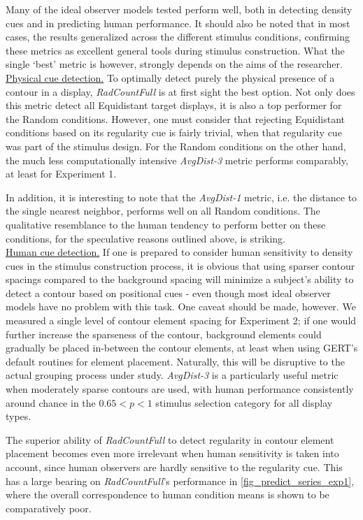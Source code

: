 \documentclass[12pt]{article}
\begin{document}
Many of the ideal observer models tested perform well, both in detecting density cues and in predicting human performance. It should also be noted that in most cases, the results generalized across the different stimulus conditions, confirming these metrics as excellent general tools during stimulus construction. What the single `best' metric is however, strongly depends on the aims of the researcher. \\

\underline{Physical cue detection.} 
To optimally detect purely the physical presence of a contour in a display, \emph{RadCountFull} is at first sight the best option. Not only does this metric detect all Equidistant target displays, it is also a top performer for the Random conditions. However, one must consider that rejecting Equidistant conditions based on its regularity cue is fairly trivial, when that regularity cue was part of the stimulus design. For the Random conditions on the other hand, the much less computationally intensive \emph{AvgDist-3} metric performs comparably, at least for Experiment 1.

In addition, it is interesting to note that the \emph{AvgDist-1} metric, i.e. the distance to the single nearest neighbor, performs well on all Random conditions. The qualitative resemblance to the human tendency to perform better on these conditions, for the speculative reasons outlined above, is striking.\\

\underline{Human cue detection.} 
If one is prepared to consider human sensitivity to density cues in the stimulus construction process, it is obvious that using sparser contour spacings compared to the background spacing will minimize a subject's ability to detect a contour based on positional cues - even though most ideal observer models have no problem with this task. One caveat should be made, however. We measured a single level of contour element spacing for Experiment 2; if one would further increase the sparseness of the contour, background elements could gradually be placed in-between the contour elements, at least when using GERT's default routines for element placement. Naturally, this will be disruptive to the actual grouping process under study. \emph{AvgDist-3} is a particularly useful metric when moderately sparse contours are used, with human performance consistently around chance in the $0.65<p<1$ stimulus selection category for all display types.

The superior ability of \emph{RadCountFull} to detect regularity in contour element placement becomes even more irrelevant when human sensitivity is taken into account, since human observers are hardly sensitive to the regularity cue. This has a large bearing on \emph{RadCountFull}'s performance in \autoref{fig_predict_series_exp1}, where the overall correspondence to human condition means is shown to be comparatively poor.\\
\end{document}
